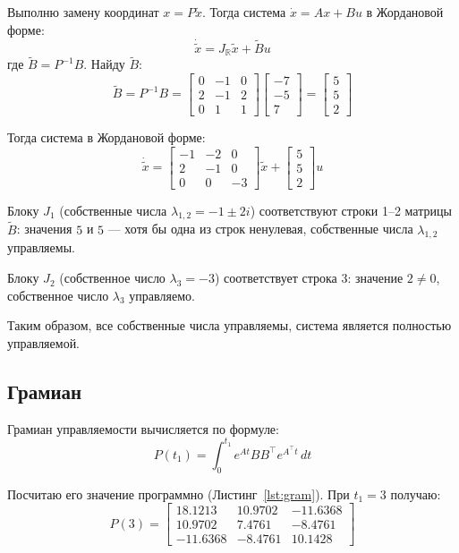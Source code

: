 \documentclass[a4paper,12pt]{article}
\begin{document}
	Выполню замену координат $x = P\tilde{x}$. Тогда система 
	$\dot{x} = Ax + Bu$ в Жордановой форме:
	\[
	\dot{\tilde{x}} = J_{\mathbb{R}} \tilde{x} + \tilde{B} u
	\]
	где $\tilde{B} = P^{-1}B$. Найду $\tilde{B}$:
	\[
	\tilde{B} = P^{-1}B = 
	\begin{bmatrix} 0 & -1 & 0 \\ 2 & -1 & 2 \\ 0 & 1 & 1 \end{bmatrix}
	\begin{bmatrix} -7 \\ -5 \\ 7 \end{bmatrix}
	= \begin{bmatrix} 5 \\ 5 \\ 2 \end{bmatrix}
	\]
	
	Тогда система в Жордановой форме:
	\[
	\dot{\tilde{x}} = 
	\begin{bmatrix} -1 & -2 & 0 \\ 2 & -1 & 0 \\ 0 & 0 & -3 \end{bmatrix} \tilde{x} +
	\begin{bmatrix} 5 \\ 5 \\ 2 \end{bmatrix} u
	\]
	
	Блоку $J_1$ (собственные числа $\lambda_{1,2} = -1 \pm 2i$) соответствуют 
	строки 1--2 матрицы $\tilde{B}$: значения $5$ и $5$ --- хотя бы одна из 
	строк ненулевая, собственные числа $\lambda_{1,2}$ управляемы.
	
	Блоку $J_2$ (собственное число $\lambda_3 = -3$) соответствует строка 3: 
	значение $2 \neq 0$, собственное число $\lambda_3$ управляемо.
	
	Таким образом, все собственные числа управляемы, система является 
	полностью управляемой.
	
	\subsection{Грамиан}
	
	Грамиан управляемости вычисляется по формуле:
	\[
	P(t_1) = \int_0^{t_1} e^{At} B B^\top e^{A^\top t}\, dt
	\]
	
	Посчитаю его значение программно (Листинг~\ref{lst:gram}). При $t_1 = 3$ получаю:
	\[
	P(3) = 
	\begin{bmatrix}
		18.1213 & 10.9702 & -11.6368 \\
		10.9702 &  7.4761 &  -8.4761 \\
		-11.6368 & -8.4761 &  10.1428
	\end{bmatrix}
	\]
	
\end{document}
